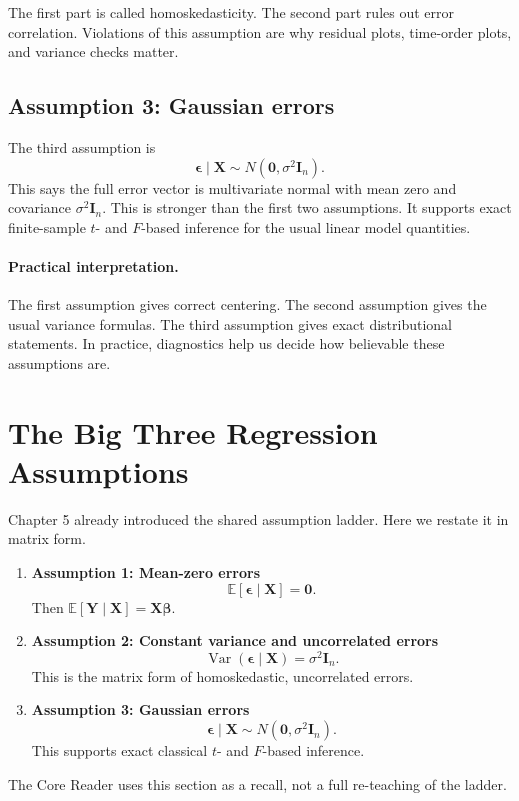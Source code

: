 {The first part is called homoskedasticity.  The second part rules out error correlation.  Violations of this assumption are why residual plots, time-order plots, and variance checks matter.

\subsection*{Assumption 3: Gaussian errors}

The third assumption is
\begin{equation}
  \boldsymbol{\epsilon}\mid\mathbf{X}\sim N(\mathbf{0},\sigma^2\mathbf{I}_n).
  \label{eq:ch10-gaussian-errors}
\end{equation}
This says the full error vector is multivariate normal with mean zero and covariance \(\sigma^2\mathbf{I}_n\).  This is stronger than the first two assumptions.  It supports exact finite-sample \(t\)- and \(F\)-based inference for the usual linear model quantities.

\paragraph{Practical interpretation.}
The first assumption gives correct centering.  The second assumption gives the usual variance formulas.  The third assumption gives exact distributional statements.  In practice, diagnostics help us decide how believable these assumptions are.
}{
\section{The Big Three Regression Assumptions}

Chapter 5 already introduced the shared assumption ladder.  Here we restate it in matrix form.
\begin{enumerate}
  \item \textbf{Assumption 1: Mean-zero errors}
  \begin{equation}
    \mathbb{E}[\boldsymbol{\epsilon}\mid \mathbf{X}]=\mathbf{0}.
    \label{eq:ch10-mean-zero-errors}
  \end{equation}
  Then \(\mathbb{E}[\mathbf{Y}\mid\mathbf{X}]=\mathbf{X}\boldsymbol{\beta}\).
  \item \textbf{Assumption 2: Constant variance and uncorrelated errors}
  \begin{equation}
    \operatorname{Var}(\boldsymbol{\epsilon}\mid\mathbf{X})=\sigma^2\mathbf{I}_n.
    \label{eq:ch10-homoskedastic-errors}
  \end{equation}
  This is the matrix form of homoskedastic, uncorrelated errors.
  \item \textbf{Assumption 3: Gaussian errors}
  \begin{equation}
    \boldsymbol{\epsilon}\mid\mathbf{X}\sim N(\mathbf{0},\sigma^2\mathbf{I}_n).
    \label{eq:ch10-gaussian-errors}
  \end{equation}
  This supports exact classical \(t\)- and \(F\)-based inference.
\end{enumerate}

The Core Reader uses this section as a recall, not a full re-teaching of the ladder.
}

